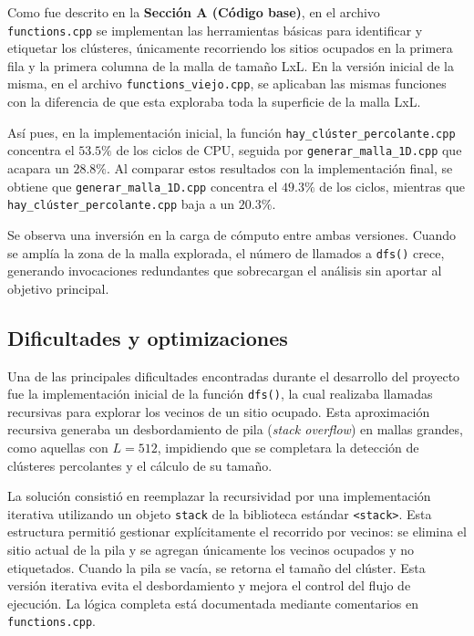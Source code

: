 \documentclass[%
 reprint,
 amsmath,amssymb,
 aps,
]{revtex4-2}
\begin{document}
Como fue descrito en la \textbf{ Sección A (Código base)}, en el archivo \texttt{functions.cpp} se implementan las herramientas básicas para identificar y etiquetar los clústeres, únicamente recorriendo los sitios ocupados en la primera fila y la primera columna de la malla de tamaño LxL. En la versión inicial de la misma, en el archivo \texttt{functions\_viejo.cpp}, se aplicaban las mismas funciones con la diferencia de que esta exploraba toda la superficie de la malla LxL. 

Así pues, en la implementación inicial, la función \texttt{hay\_clúster\_percolante.cpp} concentra el $53.5\%$ de los ciclos de CPU, seguida por \texttt{generar\_malla\_1D.cpp} que acapara un $28.8\%$. Al comparar estos resultados con la implementación final, se obtiene que \texttt{generar\_malla\_1D.cpp} concentra el $49.3\%$ de los ciclos, mientras que \texttt{hay\_clúster\_percolante.cpp} baja a un $20.3\%$. 

Se observa una inversión en la carga de cómputo entre ambas versiones. Cuando se amplía la zona de la malla explorada, el número de llamados a \texttt{dfs()} crece, generando invocaciones redundantes que sobrecargan el análisis sin aportar al objetivo principal.

\subsection{Dificultades y optimizaciones}

Una de las principales dificultades encontradas durante el desarrollo del proyecto fue la implementación inicial de la función \texttt{dfs()}, la cual realizaba llamadas recursivas para explorar los vecinos de un sitio ocupado. Esta aproximación recursiva generaba un desbordamiento de pila (\textit{stack overflow}) en mallas grandes, como aquellas con \( L = 512 \), impidiendo que se completara la detección de clústeres percolantes y el cálculo de su tamaño.

La solución consistió en reemplazar la recursividad por una implementación iterativa utilizando un objeto \texttt{stack} de la biblioteca estándar \texttt{<stack>}. Esta estructura permitió gestionar explícitamente el recorrido por vecinos: se elimina el sitio actual de la pila y se agregan únicamente los vecinos ocupados y no etiquetados. Cuando la pila se vacía, se retorna el tamaño del clúster. Esta versión iterativa evita el desbordamiento y mejora el control del flujo de ejecución. La lógica completa está documentada mediante comentarios en \texttt{functions.cpp}.
\end{document}
